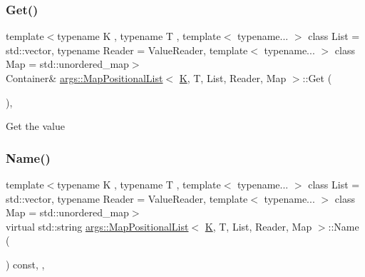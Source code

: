 \mbox{\label{classargs_1_1_map_positional_list_ad34d106fb81d46943392c74fb987fd27}} 
\subsubsection{\texorpdfstring{Get()}{Get()}}
{\footnotesize\ttfamily template$<$typename K , typename T , template$<$ typename... $>$ class List = std\+::vector, typename Reader  = Value\+Reader, template$<$ typename... $>$ class Map = std\+::unordered\+\_\+map$>$ \\
Container\& \hyperlink{classargs_1_1_map_positional_list}{args\+::\+Map\+Positional\+List}$<$ \hyperlink{cgal__test_8cpp_a891e241aa245ae63618f03737efba309}{K}, T, List, Reader, Map $>$\+::Get (\begin{DoxyParamCaption}{ }\end{DoxyParamCaption})\hspace{0.3cm}{\ttfamily [inline]}, {\ttfamily [noexcept]}}

Get the value \mbox{\label{classargs_1_1_map_positional_list_a06d9cd19fea86e0027f2ab4a491f19bb}} 
\subsubsection{\texorpdfstring{Name()}{Name()}}
{\footnotesize\ttfamily template$<$typename K , typename T , template$<$ typename... $>$ class List = std\+::vector, typename Reader  = Value\+Reader, template$<$ typename... $>$ class Map = std\+::unordered\+\_\+map$>$ \\
virtual std\+::string \hyperlink{classargs_1_1_map_positional_list}{args\+::\+Map\+Positional\+List}$<$ \hyperlink{cgal__test_8cpp_a891e241aa245ae63618f03737efba309}{K}, T, List, Reader, Map $>$\+::Name (\begin{DoxyParamCaption}{ }\end{DoxyParamCaption}) const\hspace{0.3cm}{\ttfamily [inline]}, {\ttfamily [override]}, {\ttfamily [virtual]}}



